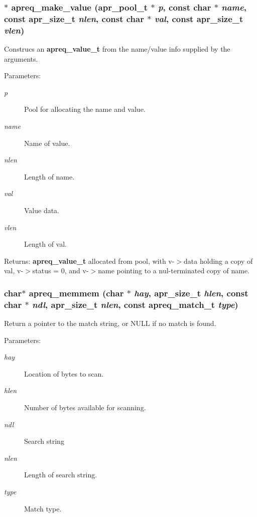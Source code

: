 \subsubsection{$\ast$ apreq\_\-make\_\-value ({\bf apr\_\-pool\_\-t} $\ast$ {\em p}, const char $\ast$ {\em name}, const {\bf apr\_\-size\_\-t} {\em nlen}, const char $\ast$ {\em val}, const {\bf apr\_\-size\_\-t} {\em vlen})}\label{group__Utils_a3}


Construcs an {\bf apreq\_\-value\_\-t} from the name/value info supplied by the arguments.

\begin{Desc}
\item[Parameters:]
\begin{description}
\item[{\em p}]Pool for allocating the name and value. \item[{\em name}]Name of value. \item[{\em nlen}]Length of name. \item[{\em val}]Value data. \item[{\em vlen}]Length of val. \end{description}
\end{Desc}
\begin{Desc}
\item[Returns:]{\bf apreq\_\-value\_\-t} allocated from pool, with v-$>$data holding a copy of val, v-$>$status = 0, and v-$>$name pointing to a nul-terminated copy of name. \end{Desc}
\subsubsection{\setlength{\rightskip}{0pt plus 5cm}char$\ast$ apreq\_\-memmem (char $\ast$ {\em hay}, {\bf apr\_\-size\_\-t} {\em hlen}, const char $\ast$ {\em ndl}, {\bf apr\_\-size\_\-t} {\em nlen}, const {\bf apreq\_\-match\_\-t} {\em type})}\label{group__Utils_a8}


Return a pointer to the match string, or NULL if no match is found. \begin{Desc}
\item[Parameters:]
\begin{description}
\item[{\em hay}]Location of bytes to scan. \item[{\em hlen}]Number of bytes available for scanning. \item[{\em ndl}]Search string \item[{\em nlen}]Length of search string. \item[{\em type}]Match type. \end{description}
\end{Desc}
